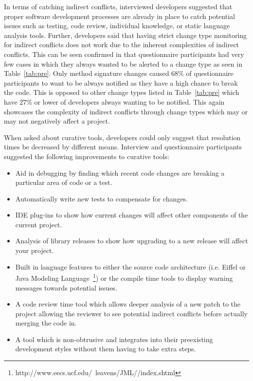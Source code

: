 \documentclass[conference]{IEEEtran}
\begin{document}
In terms of catching indirect conflicts, interviewed developers suggested that proper software development processes
are already in place to catch potential issues such as testing, code review,
individual knowledge, or static language analysis tools. Further, developers said that having strict change type monitoring
for indirect conflicts does not work due to the inherent complexities of indirect conflicts.
This can be seen confirmed in that questionnaire participants had very few cases in which they always wanted to be
alerted to a change type as seen in Table~\ref{tab:pre}. Only method signature changes caused 68\% of questionnaire participants
to want to be always notified as they have a high chance to break the code. This is opposed to other change types listed in
Table~\ref{tab:pre} which have 27\% or lower of developers always wanting to be notified. This again showcases the
complexity of indirect conflicts through change types which may or may not negatively affect a project.

When asked about curative tools, developers could only suggest that resolution times be decreased by different means.
Interview and questionnaire participants suggested the following improvements to curative tools:

\begin{itemize}
	\item Aid in debugging by finding which recent code changes are breaking a particular area of code or a test.
	\item Automatically write new tests to compensate for changes.
	\item IDE plug-ins to show how current changes will affect other components of the current project.
	\item Analysis of library releases to show how upgrading to a new release will affect your project.
	\item Built in language features to either the source code architecture (i.e. Eiffel or
				Java Modeling Language~\footnote{http://www.eecs.ucf.edu/~leavens/JML//index.shtml}) or the compile
				time tools to display warning messages towards potential issues.
	\item A code review time tool which allows deeper analysis of a new patch to the project allowing the reviewer to see potential
				indirect conflicts before actually merging the code in.
	\item A tool which is non-obtrusive and integrates into their preexisting development styles without them having to take extra steps.
\end{itemize}
\end{document}
